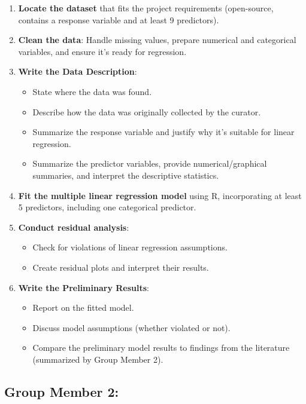 \documentclass[
  letterpaper,
  DIV=11,
  numbers=noendperiod]{scrartcl}
\providecommand{\tightlist}{%
  \setlength{\itemsep}{0pt}\setlength{\parskip}{0pt}}\usepackage{longtable,booktabs,array}
\begin{document}
\begin{enumerate}
\def\labelenumi{\arabic{enumi}.}
\tightlist
\item
  \textbf{Locate the dataset} that fits the project requirements
  (open-source, contains a response variable and at least 9 predictors).
\item
  \textbf{Clean the data}: Handle missing values, prepare numerical and
  categorical variables, and ensure it's ready for regression.
\item
  \textbf{Write the Data Description}:

  \begin{itemize}
  \tightlist
  \item
    State where the data was found.
  \item
    Describe how the data was originally collected by the curator.
  \item
    Summarize the response variable and justify why it's suitable for
    linear regression.
  \item
    Summarize the predictor variables, provide numerical/graphical
    summaries, and interpret the descriptive statistics.
  \end{itemize}
\item
  \textbf{Fit the multiple linear regression model} using R,
  incorporating at least 5 predictors, including one categorical
  predictor.
\item
  \textbf{Conduct residual analysis}:

  \begin{itemize}
  \tightlist
  \item
    Check for violations of linear regression assumptions.
  \item
    Create residual plots and interpret their results.
  \end{itemize}
\item
  \textbf{Write the Preliminary Results}:

  \begin{itemize}
  \tightlist
  \item
    Report on the fitted model.
  \item
    Discuss model assumptions (whether violated or not).
  \item
    Compare the preliminary model results to findings from the
    literature (summarized by Group Member 2).
  \end{itemize}
\end{enumerate}

\subsection{Group Member 2:}\label{group-member-2}
\end{document}
